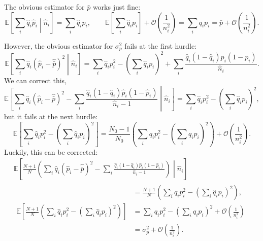 \documentclass[12pt]{article}
\newcommand{\E}{\mathbb{E}}
\newcommand{\CO}{\mathcal{O}}
\newcommand{\prn}[1]{\left ( #1 \right )}
\newcommand{\brk}[1]{\left [ #1 \right ]}
\begin{document}
The obvious estimator for $\bar{p}$ works just fine:
%
\begin{equation}\label{eq:pbarest}
  \E\brk{\sum_i\hat{q}_i\hat{p}_i\middle|\hat{n}_i} = \sum_i \hat{q}_ip_i,
  \qquad
  \E\brk{\sum_i\hat{q}_ip_i} + \CO\prn{\frac{1}{n_i^2}} = \sum_iq_ip_i = \bar{p} + \CO\prn{\frac{1}{n_i^2}}.
\end{equation}
%

However, the obvious estimator for $\sigma_p^2$ fails at the first hurdle:
%
\begin{equation}\label{eq:sigest1}
  \E\brk{\sum_i\hat{q}_i(\hat{p}_i-\hat{\bar{p}})^2\middle|\hat{n}_i} = \sum_i \hat{q}_i p_i^2 - \prn{\sum_i \hat{q}_ip_i}^2 + \sum_i \frac{\hat{q}_i (1-\hat{q}_i)p_i(1-p_i)}{\hat{n}_i}.
\end{equation}
%
We can correct this,
%
\begin{equation}\label{eq:sigest2}
  \E\brk{\sum_i\hat{q}_i(\hat{p}_i-\hat{\bar{p}})^2 - \sum_i \frac{\hat{q}_i (1-\hat{q}_i)\hat{p}_i(1-\hat{p}_i)}{\hat{n}_i-1} \middle|\hat{n}_i} = \sum_i \hat{q}_i p_i^2 - \prn{\sum_i \hat{q}_ip_i}^2 ,
\end{equation}
%
but it fails at the next hurdle:
%
\begin{equation}\label{eq:sigest3}
  \E\brk{\sum_i \hat{q}_i p_i^2 - \prn{\sum_i \hat{q}_ip_i}^2 } = \frac{N_0-1}{N_0}\prn{\sum_i q_i p_i^2 - \prn{\sum_i q_ip_i}^2} + \CO\prn{\frac{1}{n_i^2}}.
\end{equation}
%
Luckily, this can be corrected:
%
\begin{equation}\label{eq:sigest4}
\begin{aligned}&
  \E\brk{\frac{N+1}{N}\prn{\sum_i\hat{q}_i(\hat{p}_i-\hat{\bar{p}})^2 - \sum_i \frac{\hat{q}_i (1-\hat{q}_i)\hat{p}_i(1-\hat{p}_i)}{\hat{n}_i-1} } \middle|\hat{n}_i}
  \phantom{\sum_i q_i p_i^2 - \prn{\sum_i q_ip_i}} \\
&\begin{aligned}
  &= \frac{N+1}{N}\prn{\sum_i \hat{q}_i p_i^2 - \prn{\sum_i \hat{q}_ip_i}^2} ,\\
  \E\brk{\frac{N+1}{N}\prn{\sum_i \hat{q}_i p_i^2 - \prn{\sum_i \hat{q}_ip_i}^2} } &= \sum_i q_i p_i^2 - \prn{\sum_i q_ip_i}^2 + \CO\prn{\frac{1}{n_i^2}} \\&= \sigma_p^2 + \CO\prn{\frac{1}{n_i^2}}.
\end{aligned}
\end{aligned}
\end{equation}
%
\end{document}
